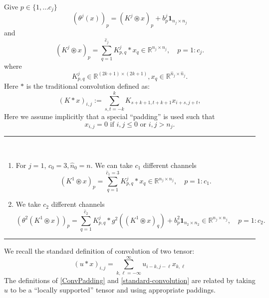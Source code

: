 Give $p\in \{1,\ldots c_j\}$
\begin{equation}
(\theta^j(x))_p= (K^j \circledast x)_p+b^j_p{\bm 1}_{n_j\times n_j}
\end{equation}
and
\begin{equation}
(K^j \circledast x)_p
= \sum_{q=1}^{\hat c_{j}} K^{j}_{p,q} \ast x_q \in \mathbb{R}^{n_j \times n_j}, \quad p= 1:c_j.
\end{equation}
where
$$
K^{j}_{p,q}\in \mathbb R^{(2k+1)\times (2k+1)}, x_q\in \mathbb
R^{\hat n_{j}\times \hat n_{j}}.
$$
Here $\ast$ is the traditional convolution defined as:
\begin{equation}\label{ConvPadding}
(K \ast x)_{i,j} :=\sum_{s, t = -k}^k  K_{s+k+1,t+k+1} x_{i + s, j + t},
\end{equation}
Here we assume implicitly that a special ``padding'' is used such that
\begin{equation}
\label{zero-padding}
x_{i,j}=0 \mbox{ if } i, j\le 0 \mbox{ or } i, j > n_j.  
\end{equation}

\bigskip \hrule \bigskip  
\begin{example} ~
\begin{enumerate}
	\item 
	For $j=1$, $c_0=3, \hat n_0=n$.   We can take $c_1$ different channels
	\begin{equation}
	(K^1 \circledast x)_p= \sum_{q=1}^{\hat{c}_1=3} K^{j}_{p,q} \ast x_q \in \mathbb{R}^{n_j \times n_j}, \quad p= 1:c_1.
	\end{equation}
	\item We take $c_2$ different channels
	\begin{equation}
	\left(\theta^2(K^1 \circledast x)\right)_p= \sum_{q=1}^{\hat c_2} K^{j}_{p,q} \ast g^2\left((K^1 \circledast x)_q\right) + b^2_p{\bm 1}_{n_2\times n_2} \in \mathbb{R}^{n_j \times n_j}, \quad p= 1:c_2.
	\end{equation}
\end{enumerate}
\end{example}
\bigskip \hrule \bigskip  


\begin{remark}
	We recall the standard definition of convolution of two tensor:
	\begin{equation}
	\label{standard-convolution}
	(u\ast x)_{i,j}=\sum_{k,\ell=-\infty}^\infty u_{i-k,j-\ell}x_{k,\ell}  
	\end{equation}
	The definitions of \eqref{ConvPadding} and
	\eqref{standard-convolution} are related by taking $u$ to be a ``locally
	supported'' tensor and using appropriate paddings.
\end{remark}


